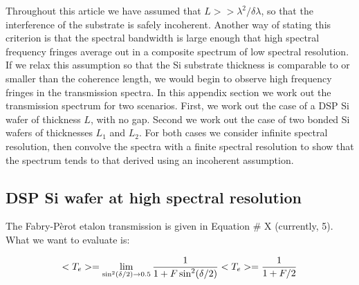 \documentclass[osajnl,preprint,showpacs,superscriptaddress,12pt]{revtex4-1} %
\begin{document}
Throughout this article we have assumed that $L >> \lambda^2 / \delta \lambda$, so that the interference of the substrate is safely incoherent.  Another way of stating this criterion is that the spectral bandwidth is large enough that high spectral frequency fringes average out in a composite spectrum of low spectral resolution.  If we relax this assumption so that the Si substrate thickness is comparable to or smaller than the coherence length, we would begin to observe high frequency fringes in the transmission spectra.  In this appendix section we work out the transmission spectrum for two scenarios.  First, we work out the case of a DSP Si wafer of thickness $L$, with no gap.  Second we work out the case of two bonded Si wafers of thicknesses $L_1$ and $L_2$.  For both cases we consider infinite spectral resolution, then convolve the spectra with a finite spectral resolution to show that the spectrum tends to that derived using an incoherent assumption.  

\subsection{DSP Si wafer at high spectral resolution}
The Fabry-P\`erot etalon transmission is given in Equation \# X (currently, 5).  What we want to evaluate is:
  
$$
 <T_e> = \lim_{\sin^2(\delta/2) \to 0.5} \frac{1}{1+F\sin^2(\delta/2)} \\
 <T_e> = \frac{1}{1+F/2}
$$









\end{document}
